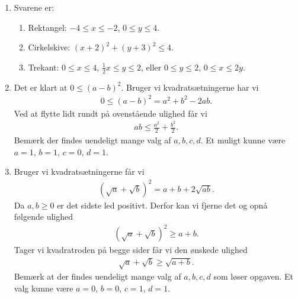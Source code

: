 \begin{enumerate}
\item Svarene er:
\begin{enumerate}
	\item Rektangel: $ -4\leq x\leq -2 $, $ 0\leq y\leq 4 $.
	\item Cirkelskive: $ (x+2)^2+(y+3)^2\leq 4 $.
	\item Trekant: $ 0\leq x\leq 4 $, $ \frac{1}{2}x\leq y\leq 2 $, eller $0\leq y\leq 2$, $ 0\leq x\leq 2y $.
\end{enumerate}
%

\item Det er klart at $0\leq (a-b)^2$. Bruger vi kvadratsætningerne har vi
\begin{align*}
0 \leq (a-b)^2=a^2+b^2-2ab.
\end{align*}
Ved at flytte lidt rundt på ovenstående ulighed får vi
\begin{align*}
ab\leq \frac{a^2}{2}+\frac{b^2}{2}.
\end{align*}
Bemærk der findes uendeligt mange valg af $a,b,c,d$. Et muligt kunne være $a=1$, $b=1$, $c=0$, $d=1$.


\item Bruger vi kvadratsætningerne får vi
\begin{align*}
(\sqrt{a}+\sqrt{b})^2=a+b+2\sqrt{ab}.
\end{align*}
Da $a,b\geq 0$ er det sidste led positivt. Derfor kan vi fjerne det og opnå følgende ulighed
\begin{align*}
(\sqrt{a}+\sqrt{b})^2\geq a+b.
\end{align*}
Tager vi kvadratroden på begge sider får vi den ønskede ulighed
\begin{align*}
\sqrt{a}+\sqrt{b}\geq \sqrt{a+b}.
\end{align*}
Bemærk at der findes uendeligt mange valg af $a,b,c,d$ som løser opgaven. Et valg kunne være $a=0$, $b=0$, $c=1$, $ d=1 $.
\end{enumerate}